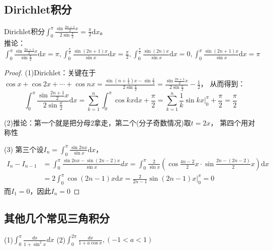 ~



\subsection{Dirichlet积分}

\begin{theorem}[Dirichlet积分]
  Dirichlet积分$\int_0^{\pi} \frac{\sin \frac{2n + 1}{2}x}{2 \sin \frac{x}{2}} = \frac{\pi}{2}\mathrm{d}x$。\\
  推论：$\int_0^{\pi} \frac{\sin \frac{2n+1}{2}x}{\sin \frac{x}{2}} \mathrm{d}x = \pi, \int_0^{\frac{\pi}{2}} \frac{\sin(2n + 1)x}{\sin x}\mathrm{d} x = \frac{\pi}{2}, \int_0^{\frac{\pi}{2}} \frac{\sin(2n)x}{\sin x}\mathrm{d}x = 0, \int_0^{\pi}\frac{\sin(2n+1)x}{\sin x}\mathrm{d} x = \pi$
\end{theorem}

\begin{proof}
  (1)Dirichlet：关键在于$\cos x + \cos 2x + \cdots + \cos nx = \frac{\sin(n+\frac{1}{2})x - \sin \frac{x}{2}}{2 \sin \frac{x}{2}} = \frac{\sin \frac{2n + 1}{2}x}{2 \sin \frac{x}{2}} - \frac{1}{2}$，
  从而得到：
  \begin{equation*}
    \int_0^{\pi} \frac{\sin \frac{2n+1}{2}x}{2 \sin \frac{x}{2}} \mathrm{d}x = \sum\limits_{k = 1}^n \int_0^{\pi} \cos kx \mathrm{d}x + \frac{\pi}{2} = \sum\limits_{k = 1}^n \frac{1}{k} \sin kx \bigg|_0^{\pi} + \frac{\pi}{2} = \frac{\pi}{2}
  \end{equation*}

  (2)推论：第一个就是把分母$2$拿走，第二个(分子奇数情况)取$t = 2x$，
  第四个用对称性

  (3)
  第三个设$I_n = \int_0^{\pi} \frac{\sin 2n x}{ \sin x}\mathrm{d} x$，
  \begin{align*}
    I_n - I_{n-1} &= \int_0^{\pi}\frac{\sin 2nx - \sin (2n - 2)x}{\sin x}dx = \int_0^{\pi} \frac{2}{\sin x}(\cos \frac{4n - 2}{2}x \cdot \sin \frac{2n-(2n-2)}{2}x)\mathrm{d} x\\
   & = 2 \int_0^{\pi} \cos (2n - 1)x \mathrm{d} x = \frac{2}{2n - 1}\sin (2n - 1)x \bigg|^{\pi}_0 = 0 
  \end{align*}
  而$I_1 = 0$，因此$I_n = 0$
\end{proof}


\subsection{其他几个常见三角积分}

\begin{exercise}[几个常见三角分数积分]
  (1)$\int_0^{\pi} \frac{dx}{1 + \sin^2 x}dx $
  (2)$\int_0^{2\pi} \frac{dx}{1 + a \cos x}, (-1 < a < 1)$
\end{exercise}

